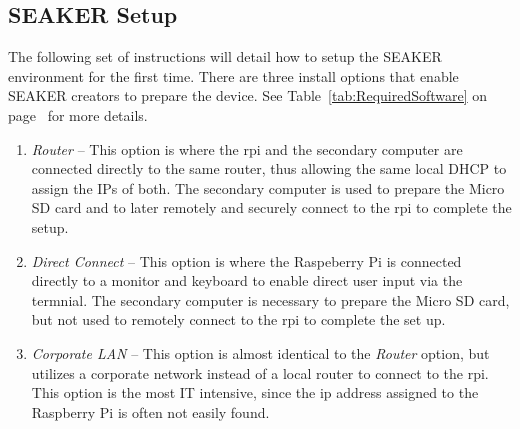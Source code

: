 \documentclass[12pt]{article}
\begin{document}
\subsection{SEAKER Setup}
The following set of instructions will detail how to setup the SEAKER
environment for the first time. There are three install options that
enable SEAKER creators to prepare the device.  See
Table~\ref{tab:RequiredSoftware} on page~\pageref{tab:RequiredSoftware}
for more details.

\vspace{0.5 cm}
\begin{enumerate}
  \item {\em Router} -- This option is where the \gls{rpi} and the
  secondary computer are connected directly to the same router, thus
  allowing the same local DHCP to assign the IPs of both.  The
  secondary computer is used to prepare the Micro SD card and to later
  remotely and securely connect to the \gls{rpi} to complete the
  setup.
  
  \item {\em Direct Connect} -- This option is where the Raspeberry Pi
  is connected directly to a monitor and keyboard to enable direct
  user input via the termnial.  The secondary computer is necessary to
  prepare the Micro SD card, but not used to remotely connect to the
  \gls{rpi} to complete the set up.

  \item {\em Corporate LAN} -- This option is almost identical to the
  {\em Router} option, but utilizes a corporate network instead of
  a local router to connect to the \gls{rpi}.  This option is the
  most IT intensive, since the \gls{ip} address assigned to the Raspberry
  Pi is often not easily found.
\end{enumerate}
\vspace{0.5 cm}
\end{document}
